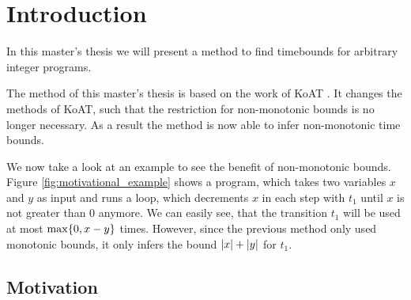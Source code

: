\section{Introduction}

In this master's thesis we will present a method to find timebounds for arbitrary integer programs.

The method of this master's thesis is based on the work of KoAT \cite{brockschmidt2016analyzing}.
It changes the methods of KoAT, such that the restriction for non-monotonic bounds is no longer necessary.
As a result the method is now able to infer non-monotonic time bounds.

We now take a look at an example to see the benefit of non-monotonic bounds.
Figure \ref{fig:motivational_example} shows a program, which takes two variables $x$ and $y$ as input and runs a loop, which decrements $x$ in each step with $t_1$ until $x$ is not greater than 0 anymore.
We can easily see, that the transition $t_1$ will be used at most $\max \lbrace 0, x-y \rbrace$ times.
However, since the previous method only used monotonic bounds, it only infers the bound $\left|x\right|+\left|y\right|$ for $t_1$.

\subsection{Motivation}





